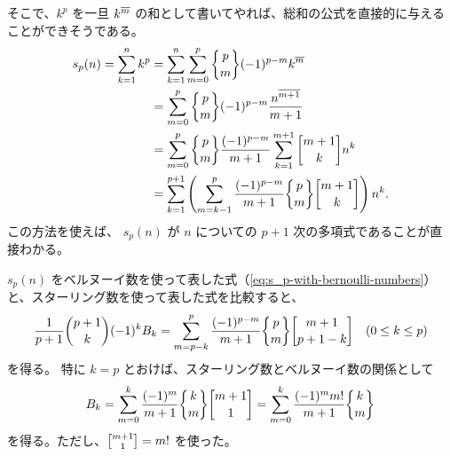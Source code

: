 {そこで、$k^p$ を一旦 ${k}^{\overline{m}}$ の和として書いてやれば、総和の公式を直接的に与えることができそうである。
\begin{align*}
  s_p(n)=\sum_{k=1}^n k^p
  &=\sum_{k=1}^n \sum_{m=0}^p \stirlingII{p}{m}(-1)^{p-m} \risingFactorial{k}{m} \\
  &=\sum_{m=0}^p \stirlingII{p}{m}(-1)^{p-m} \frac{\risingFactorial{n}{m+1}}{m+1} \\
  &=\sum_{m=0}^p \stirlingII{p}{m}\frac{(-1)^{p-m}}{m+1} \sum_{k=1}^{m+1} \stirlingI{m+1}{k} n^k \\
  &=\sum_{k=1}^{p+1} \left(\sum_{m=k-1}^p \frac{(-1)^{p-m}}{m+1} \stirlingII{p}{m} \stirlingI{m+1}{k}\right) n^k.
\end{align*}
この方法を使えば、 $s_p(n)$ が $n$ についての $p+1$ 次の多項式であることが直接わかる。

$s_p(n)$ をベルヌーイ数を使って表した式（\autoref{eq:s_p-with-bernoulli-numbers}）と、スターリング数を使って表した式を比較すると、
\[
  \frac{1}{p+1} \binom{p+1}{k} (-1)^{k} B_{k}
  =\sum_{m=p-k}^p \frac{(-1)^{p-m}}{m+1} \stirlingII{p}{m} \stirlingI{m+1}{p+1-k}
  \quad (0\le k\le p)
\]
を得る。
特に $k=p$ とおけば、スターリング数とベルヌーイ数の関係として
\begin{equation*}
  B_k
  =\sum_{m=0}^k \frac{(-1)^{m}}{m+1} \stirlingII{k}{m} \stirlingI{m+1}{1}
  =\sum_{m=0}^k \frac{(-1)^{m}m!}{m+1} \stirlingII{k}{m}
\end{equation*}
を得る。ただし、$\stirlingI{m+1}{1}=m!$ を使った。


}
